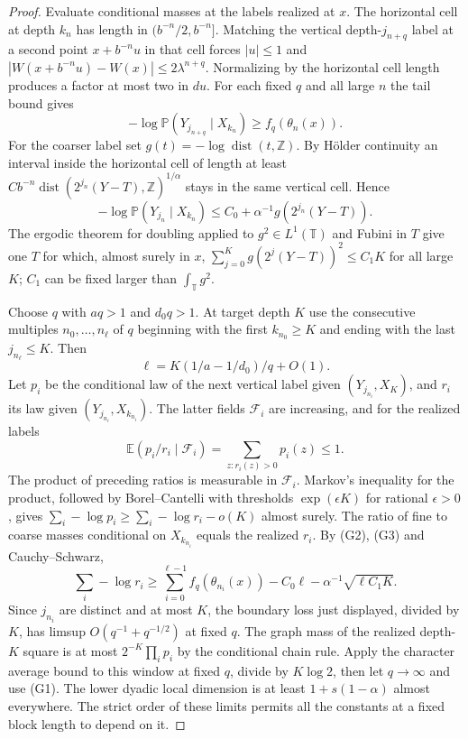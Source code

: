 \documentclass[11pt,a4paper]{article}
\newcommand{\T}{\mathbb T}
\begin{document}
\begin{proof}
Evaluate conditional masses at the labels realized at $x$. The horizontal cell at depth $k_n$ has length in $(b^{-n}/2,b^{-n}]$. Matching the vertical depth-$j_{n+q}$ label at a second point $x+b^{-n}u$ in that cell forces $|u|\le1$ and $|W(x+b^{-n}u)-W(x)|\le2\lambda^{n+q}$. Normalizing by the horizontal cell length produces a factor at most two in $du$. For each fixed $q$ and all large $n$ the tail bound gives
\[
 -\log\mathbb P(Y_{j_{n+q}}\mid X_{k_n})\ge f_q(\theta_n(x)).
 \tag{G2}
\]
For the coarser label set $g(t)=-\log\operatorname{dist}(t,\mathbb Z)$. By H\"older continuity an interval inside the horizontal cell of length at least $C b^{-n}\operatorname{dist}(2^{j_n}(Y-T),\mathbb Z)^{1/\alpha}$ stays in the same vertical cell. Hence
\[
 -\log\mathbb P(Y_{j_n}\mid X_{k_n})
  \le C_0+\alpha^{-1}g(2^{j_n}(Y-T)).
 \tag{G3}
\]
The ergodic theorem for doubling applied to $g^2\in L^1(\T)$ and Fubini in $T$ give one $T$ for which, almost surely in $x$, $\sum_{j=0}^K g(2^j(Y-T))^2\le C_1K$ for all large $K$; $C_1$ can be fixed larger than $\int_\T g^2$.

Choose $q$ with $a q>1$ and $d_0 q>1$. At target depth $K$ use the consecutive multiples $n_0,\dots,n_\ell$ of $q$ beginning with the first $k_{n_0}\ge K$ and ending with the last $j_{n_\ell}\le K$. Then
\[
 \ell=K(1/a-1/d_0)/q+O(1).
\]
Let $p_i$ be the conditional law of the next vertical label given $(Y_{j_{n_i}},X_K)$, and $r_i$ its law given $(Y_{j_{n_i}},X_{k_{n_i}})$. The latter fields $\mathcal F_i$ are increasing, and for the realized labels
\[
 \mathbb E(p_i/r_i\mid\mathcal F_i)
   =\sum_{z:r_i(z)>0}p_i(z)\le1 .
\]
The product of preceding ratios is measurable in $\mathcal F_i$. Markov's inequality for the product, followed by Borel--Cantelli with thresholds $\exp(\epsilon K)$ for rational $\epsilon>0$, gives $\sum_i-\log p_i\ge\sum_i-\log r_i-o(K)$ almost surely. The ratio of fine to coarse masses conditional on $X_{k_{n_i}}$ equals the realized $r_i$. By (G2), (G3) and Cauchy--Schwarz,
\[
 \sum_i-\log r_i
 \ge \sum_{i=0}^{\ell-1}f_q(\theta_{n_i}(x))
          -C_0\ell-\alpha^{-1}\sqrt{\ell C_1K}.
\]
Since $j_{n_i}$ are distinct and at most $K$, the boundary loss just
displayed, divided by $K$, has limsup $O(q^{-1}+q^{-1/2})$ at fixed $q$.
The graph mass of the realized depth-$K$ square is at most $2^{-K}\prod_i p_i$ by the conditional chain rule. Apply the character average bound to this window at fixed $q$, divide by $K\log2$, then let $q\to\infty$ and use (G1). The lower dyadic local dimension is at least $1+s(1-\alpha)$ almost everywhere. The strict order of these limits permits all the constants at a fixed block length to depend on it.


\end{proof}
\end{document}
